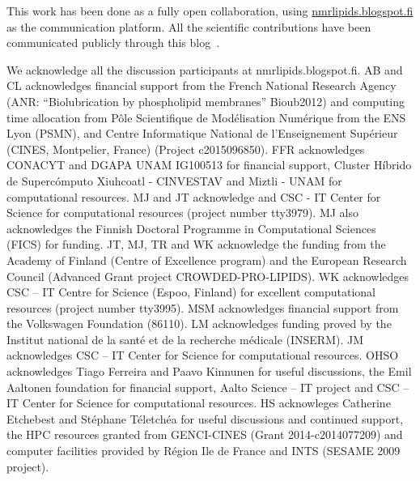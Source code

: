 \documentclass[journal=jpcbfk,manuscript=article]{achemso}
\begin{document}
This work has been done as a fully open collaboration, using \url{nmrlipids.blogspot.fi} as the communication
platform. All the scientific contributions have been communicated publicly through this blog~\cite{nmrlipids}.

\begin{acknowledgement}

We acknowledge all the discussion participants at nmrlipids.blogspot.fi.
AB and CL acknowledges financial support from the French National Research Agency
(ANR: “Biolubrication by phospholipid membranes” Bioub2012) and
computing time allocation from P{\^o}le Scientifique de Mod{\'e}lisation Num{\'e}rique from the ENS Lyon (PSMN),
and Centre Informatique National de l'Enseignement Sup{\'e}rieur (CINES, Montpelier, France)
(Project c2015096850).
FFR acknowledges CONACYT and DGAPA UNAM IG100513
for financial support, Cluster H\'ibrido de Superc\'omputo Xiuhcoatl - CINVESTAV and Miztli - UNAM for computational resources. 
MJ and JT acknowledge and CSC - IT Center for Science for computational resources (project number tty3979).
MJ also acknowledges the Finnish Doctoral Programme in Computational Sciences (FICS) for funding.
JT, MJ, TR and WK acknowledge the funding from the Academy of Finland (Centre of Excellence program) 
and the European Research Council (Advanced Grant project CROWDED-PRO-LIPIDS).
WK acknowledges CSC -- IT Centre for Science (Espoo, Finland) for excellent computational resources (project number tty3995).
MSM acknowledges financial support from the Volkswagen Foundation (86110).
LM acknowledges funding proved by the Institut national de la sant\'e et de la recherche m\'edicale (INSERM).
JM acknowledges CSC -- IT Center for Science for computational resources.
OHSO acknowledges Tiago Ferreira and Paavo Kinnunen for useful discussions, 
the Emil Aaltonen foundation for financial support, 
Aalto Science -- IT project and CSC -- IT Center for Science for computational resources. 
HS acknowleges Catherine Etchebest and St\'ephane T\'eletch\'ea for useful discussions and continued support, the HPC 
resources granted from GENCI-CINES (Grant 2014-c2014077209) and computer facilities provided by R\'egion Ile de France and INTS (SESAME 2009 project).

\end{acknowledgement}
\end{document}
